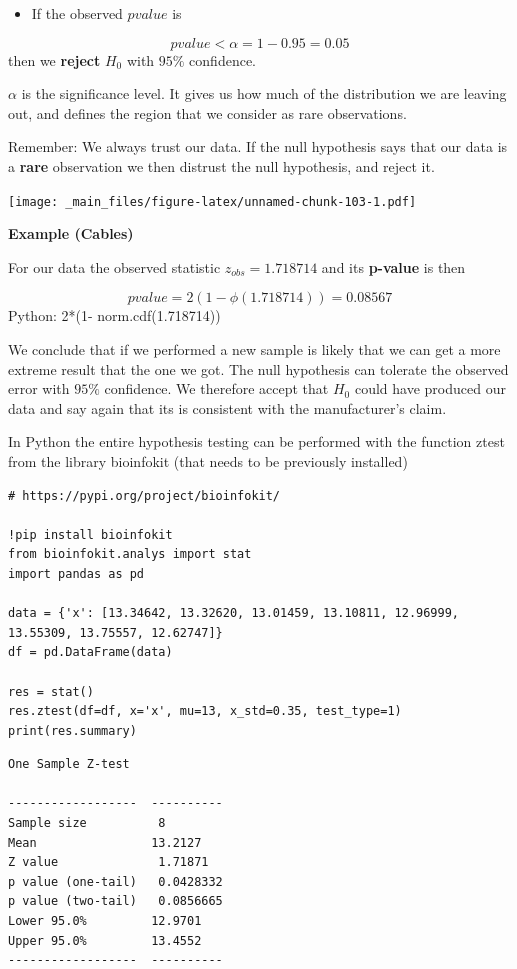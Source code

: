 \documentclass[
]{book}
\providecommand{\tightlist}{%
  \setlength{\itemsep}{0pt}\setlength{\parskip}{0pt}}
\begin{document}
\begin{itemize}
\tightlist
\item
  If the observed \(pvalue\) is
\end{itemize}

\[pvalue < \alpha =1-0.95=0.05\]
then we \textbf{reject} \(H_0\) with \(95\%\) confidence.

\(\alpha\) is the significance level. It gives us how much of the distribution we are leaving out, and defines the region that we consider as rare observations.

Remember: We always trust our data. If the null hypothesis says that our data is a \textbf{rare} observation we then distrust the null hypothesis, and reject it.

\texttt{[image: \_main\_files/figure-latex/unnamed-chunk-103-1.pdf]}

\textbf{Example (Cables)}

For our data the observed statistic \(z_{obs}=1.718714\) and its \textbf{p-value} is then

\[pvalue=2 (1-\phi(1.718714))=0.08567\]
Python: 2*(1- norm.cdf(1.718714))

We conclude that if we performed a new sample is likely that we can get a more extreme result that the one we got. The null hypothesis can tolerate the observed error with \(95\%\) confidence. We therefore accept that \(H_0\) could have produced our data and say again that its is consistent with the manufacturer's claim.

In Python the entire hypothesis testing can be performed with the function ztest from the library bioinfokit (that needs to be previously installed)

\begin{verbatim}
# https://pypi.org/project/bioinfokit/

!pip install bioinfokit
from bioinfokit.analys import stat
import pandas as pd

data = {'x': [13.34642, 13.32620, 13.01459, 13.10811, 12.96999, 13.55309, 13.75557, 12.62747]}
df = pd.DataFrame(data)

res = stat()
res.ztest(df=df, x='x', mu=13, x_std=0.35, test_type=1)
print(res.summary)
\end{verbatim}

\begin{verbatim}
One Sample Z-test 

------------------  ----------
Sample size          8
Mean                13.2127
Z value              1.71871
p value (one-tail)   0.0428332
p value (two-tail)   0.0856665
Lower 95.0%         12.9701
Upper 95.0%         13.4552
------------------  ----------
\end{verbatim}
\end{document}
